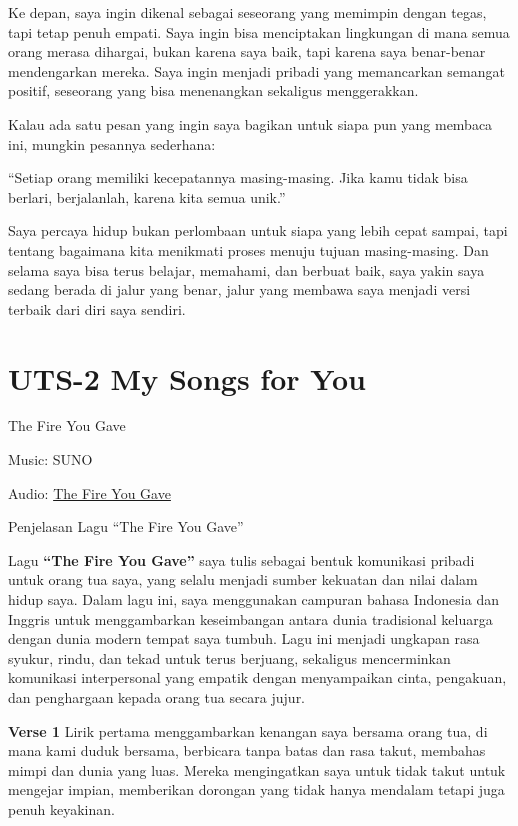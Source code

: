 \documentclass[
  letterpaper,
  DIV=11,
  numbers=noendperiod]{scrreprt}
\begin{document}
Ke depan, saya ingin dikenal sebagai seseorang yang memimpin dengan
tegas, tapi tetap penuh empati. Saya ingin bisa menciptakan lingkungan
di mana semua orang merasa dihargai, bukan karena saya baik, tapi karena
saya benar-benar mendengarkan mereka. Saya ingin menjadi pribadi yang
memancarkan semangat positif, seseorang yang bisa menenangkan sekaligus
menggerakkan.

Kalau ada satu pesan yang ingin saya bagikan untuk siapa pun yang
membaca ini, mungkin pesannya sederhana:

``Setiap orang memiliki kecepatannya masing-masing. Jika kamu tidak bisa
berlari, berjalanlah, karena kita semua unik.''

Saya percaya hidup bukan perlombaan untuk siapa yang lebih cepat sampai,
tapi tentang bagaimana kita menikmati proses menuju tujuan
masing-masing. Dan selama saya bisa terus belajar, memahami, dan berbuat
baik, saya yakin saya sedang berada di jalur yang benar, jalur yang
membawa saya menjadi versi terbaik dari diri saya sendiri.


\chapter{UTS-2 My Songs for You}\label{uts-2-my-songs-for-you}

The Fire You Gave

Music: SUNO

Audio: \href{./The\%20Fire\%20You\%20Gave.mp3}{The Fire You Gave}

Penjelasan Lagu ``The Fire You Gave''

Lagu \textbf{``The Fire You Gave''} saya tulis sebagai bentuk komunikasi
pribadi untuk orang tua saya, yang selalu menjadi sumber kekuatan dan
nilai dalam hidup saya. Dalam lagu ini, saya menggunakan campuran bahasa
Indonesia dan Inggris untuk menggambarkan keseimbangan antara dunia
tradisional keluarga dengan dunia modern tempat saya tumbuh. Lagu ini
menjadi ungkapan rasa syukur, rindu, dan tekad untuk terus berjuang,
sekaligus mencerminkan komunikasi interpersonal yang empatik dengan
menyampaikan cinta, pengakuan, dan penghargaan kepada orang tua secara
jujur.

\textbf{Verse 1} Lirik pertama menggambarkan kenangan saya bersama orang
tua, di mana kami duduk bersama, berbicara tanpa batas dan rasa takut,
membahas mimpi dan dunia yang luas. Mereka mengingatkan saya untuk tidak
takut untuk mengejar impian, memberikan dorongan yang tidak hanya
mendalam tetapi juga penuh keyakinan.
\end{document}
